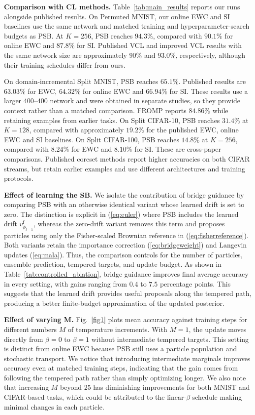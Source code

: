 \documentclass{article}
\begin{document}
\textbf{Comparison with CL methods.}
Table~\ref{tab:main_results} reports our runs alongside published results. On Permuted MNIST, our online EWC and SI baselines use the same network and matched training and hyperparameter-search budgets as PSB. At $K=256$, PSB reaches $94.3\%$, compared with $90.1\%$ for online EWC and $87.8\%$ for SI. Published VCL and improved VCL results with the same network size are approximately $90\%$ and $93.0\%$, respectively, although their training schedules differ from ours.

On domain-incremental Split MNIST, PSB reaches $65.1\%$. Published results are $63.03\%$ for EWC, $64.32\%$ for online EWC and $66.94\%$ for SI. These results use a larger $400$--$400$ network and were
obtained in separate studies, so they provide context rather than a matched comparison. FROMP reports $84.86\%$ while retaining examples from earlier tasks. On Split CIFAR-10, PSB reaches $31.4\%$ at $K=128$, compared with approximately $19.2\%$ for the published EWC, online EWC and SI baselines. On Split CIFAR-100, PSB reaches $14.8\%$ at $K=256$, compared with $8.24\%$ for EWC and $8.10\%$ for SI. These are cross-paper comparisons. Published coreset methods report higher accuracies on both CIFAR streams, but retain earlier examples and use different architectures and training protocols.

\textbf{Effect of learning the SB.}
  We isolate the contribution of bridge guidance by comparing PSB with
  an otherwise identical variant whose learned drift is set to zero.
  The distinction is explicit in (\ref{eq:euler}) where PSB includes the
  learned drift $v^{\mathrm f}_{\phi_{t-1}}$, whereas the zero-drift
  variant removes this term and proposes particles using only the
  Fisher-scaled Brownian reference in (\ref{eq:fisherreference}).
  Both variants retain the importance correction
  (\ref{eq:bridgeweight}) and Langevin updates (\ref{eq:mala}).
  Thus, the comparison controls for the number of particles, ensemble
  prediction, tempered targets, and update budget. As shown in
  Table~\ref{tab:controlled_ablation}, bridge guidance improves final
  average accuracy in every setting, with gains ranging from $0.4$ to
  $7.5$ percentage points. This suggests that the learned drift provides
  useful proposals along the tempered path, producing a better
  finite-budget approximation of the updated posterior.

\textbf{Effect of varying M.} Fig.~\ref{fig1} plots mean accuracy against training steps for different numbers $M$ of temperature increments. With $M=1$, the update moves directly from $\beta=0$ to $\beta=1$ without intermediate tempered
targets. This setting is distinct from online EWC because PSB still uses a particle population and stochastic transport. We notice that introducing intermediate marginals improves accuracy even at matched training steps, indicating that the gain comes from following the tempered path rather than simply optimizing longer. We also note that increasing $M$ beyond 25 has diminishing improvements for both MNIST and CIFAR-based tasks, which could be attributed to the linear-$\beta$ schedule making minimal changes in each particle. 
\end{document}
